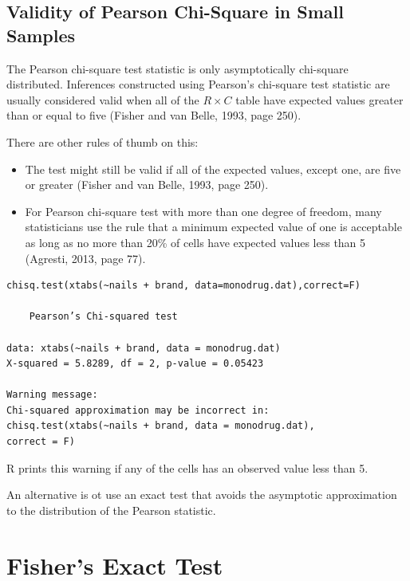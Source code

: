 \documentclass[
  letterpaper,
  DIV=11,
  numbers=noendperiod]{scrreport}
\providecommand{\tightlist}{%
  \setlength{\itemsep}{0pt}\setlength{\parskip}{0pt}}\usepackage{longtable,booktabs,array}
\begin{document}
\hypertarget{validity-of-pearson-chi-square-in-small-samples}{%
\section{Validity of Pearson Chi-Square in Small
Samples}\label{validity-of-pearson-chi-square-in-small-samples}}

The Pearson chi-square test statistic is only asymptotically chi-square
distributed. Inferences constructed using Pearson's chi-square test
statistic are usually considered valid when all of the \(R \times C\)
table have expected values greater than or equal to five (Fisher and van
Belle, 1993, page 250).

There are other rules of thumb on this:

\begin{itemize}
\tightlist
\item
  The test might still be valid if all of the expected values, except
  one, are five or greater (Fisher and van Belle, 1993, page 250).
\item
  For Pearson chi-square test with more than one degree of freedom, many
  statisticians use the rule that a minimum expected value of one is
  acceptable as long as no more than 20\% of cells have expected values
  less than 5 (Agresti, 2013, page 77).
\end{itemize}

\begin{verbatim}
chisq.test(xtabs(~nails + brand, data=monodrug.dat),correct=F)

    Pearson’s Chi-squared test

data: xtabs(~nails + brand, data = monodrug.dat)
X-squared = 5.8289, df = 2, p-value = 0.05423

Warning message:
Chi-squared approximation may be incorrect in:
chisq.test(xtabs(~nails + brand, data = monodrug.dat),
correct = F)
\end{verbatim}

R prints this warning if any of the cells has an observed value less
than 5.

An alternative is ot use an exact test that avoids the asymptotic
approximation to the distribution of the Pearson statistic.


\hypertarget{fishers-exact-test}{%
\chapter{Fisher's Exact Test}\label{fishers-exact-test}}
\end{document}
